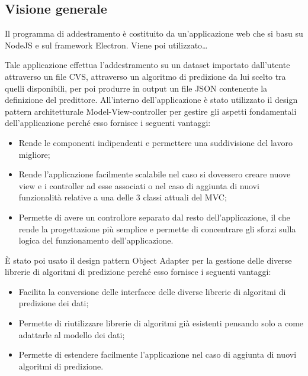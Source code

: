 \documentclass[../manuale-sviluppatore.tex]{subfiles}
\begin{document}
\subsection{Visione generale}%
\label{subs:installazione_applicazione_di_addestramento}
Il programma di addestramento è costituito da un'applicazione web che si basu su NodeJS e sul framework Electron. Viene poi utilizzato\dots

Tale applicazione effettua l'addestramento su un dataset importato dall'utente attraverso un file CVS, attraverso un algoritmo di predizione da lui scelto tra quelli disponibili, per poi produrre in output
un file JSON contenente la definizione del predittore.
All'interno dell'applicazione è stato utilizzato il design pattern architetturale Model-View-controller per gestire gli aspetti fondamentali dell'applicazione perché esso fornisce i seguenti vantaggi:
\begin{itemize}
    \item Rende le componenti indipendenti e permettere una suddivisione del lavoro migliore;
    \item Rende l'applicazione facilmente scalabile nel caso si dovessero creare nuove view e i controller ad esse associati o nel caso di aggiunta di nuovi funzionalità relative a una delle 3 classi attuali del MVC;
    \item Permette di avere un controllore separato dal resto dell’applicazione, il che rende la progettazione più semplice e permette di concentrare gli sforzi sulla logica del funzionamento dell'applicazione.
\end{itemize}

È stato poi usato il design pattern Object Adapter per la gestione delle diverse librerie di algoritmi di predizione perché esso fornisce i seguenti vantaggi:
\begin{itemize}
    \item Facilita la conversione delle interfacce delle diverse librerie di algoritmi di predizione dei dati;
    \item Permette di riutilizzare librerie di algoritmi già esistenti pensando solo a come adattarle al modello dei dati;
    \item Permette di estendere facilmente l'applicazione nel caso di aggiunta di nuovi algoritmi di predizione.
\end{itemize}
\end{document}
